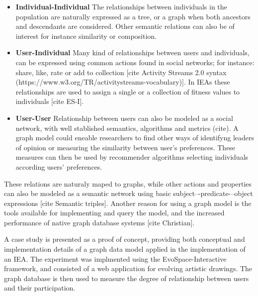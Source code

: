 \documentclass[conference]{IEEEtran}
\begin{document}
\begin{itemize}

  \item {\bf Individual-Individual} The relationships between individuals in the
  population are naturally expressed as a tree, or a graph when both ancestors 
  and descendants are considered. Other semantic relations can also be of interest
  for instance similarity or composition.


  \item {\bf User-Individual}
  Many kind of relationships between users and individuals,
  can be expressed using common actions found in social networks;
  for instance: share, like, rate or add to collection [cite Activity Streams 2.0
  syntax (https://www.w3.org/TR/activitystreams-vocabulary)]. In IEAs these
  relationships are used to assign a single or a collection of
  fitness values to individuals [cite ES-I].   

  \item {\bf User-User}
  Relationship between users can also be modeled 
  as a social network, with well stablished semantics, algorithms and metrics (cite).
  A graph model could eneable researchers to find other ways of identifyng leaders of 
  opinion or measuring the similarity between user's preferences. 
  These measures can then be used by recommender algorithms selecting 
  individuals according users' preferences. 

\end{itemize}

These relations are naturaly maped to graphs, while other actions and 
properties can also be modeled as a semantic network using
basic subject–-predicate-–object expressions [cite Semantic triples].
Another reason for using a graph model is the tools available for
implementing and query the model, and the increased performance of
native graph database systems [cite Christian].






 
A case study is presented as a proof of concept, providing both
conceptual and implementation details of a graph data model applied in the 
implementation of an IEA. The experiment was implmented using
the EvoSpace-Interactive framework, and consisted of a web application
for evolving artistic drawings. The graph database is then used to
measure the degree of relationship between users and their participation.  
\end{document}
